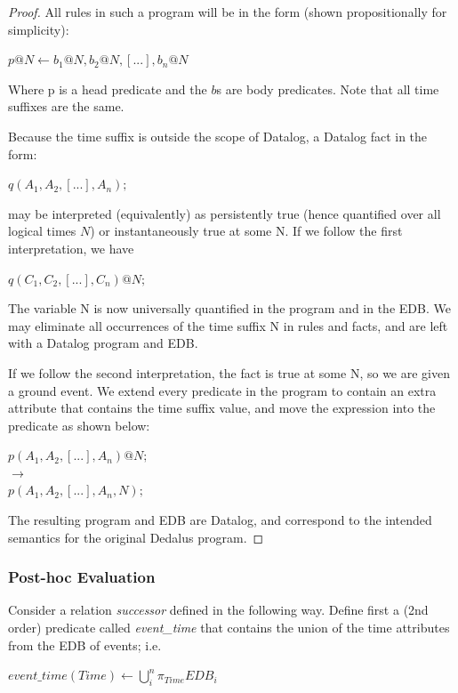 \begin{proof}
All rules in such a program will be in the form (shown propositionally for simplicity): 

$p@N \leftarrow b_{1}@N, b_{2}@N, [...], b_{n}@N$

Where p is a head predicate and the $b$s are body predicates.  Note that all time suffixes are 
the same.

Because the time suffix is outside the scope of Datalog, a Datalog fact in the form:

$q(A_{1}, A_{2}, [...], A_{n});$

may be interpreted (equivalently) as persistently true (hence quantified over all logical times $N$) or instantaneously
true at some N.  If we follow the first interpretation, we have 

$q(C_{1}, C_{2}, [...], C_{n})@N;$

The variable N is now universally quantified in the program and in the EDB.  We may eliminate all occurrences of the time suffix N
in rules and facts, and are left with a Datalog program and EDB.

If we follow the second interpretation, the fact is true at some N, so we are given a ground event.  We extend every predicate in 
the program to contain an extra attribute that contains the time suffix value, and move the expression into the predicate as shown below:

$p(A_{1}, A_{2}, [...], A_{n})@N;$\\
$\rightarrow$\\
$p(A_{1}, A_{2}, [...], A_{n}, N);$

The resulting program and EDB are Datalog, and correspond to the intended semantics for the original Dedalus program.

\end{proof}


\subsubsection{Post-hoc Evaluation}

Consider a relation \emph{successor} defined in the following way.
Define first a (2nd order) predicate called \emph{event\_time} 
that contains the union of the time attributes from the EDB of events; i.e.

$event\_time(Time) \leftarrow \displaystyle\bigcup_{i}^n \pi_{Time}EDB_{i}$

